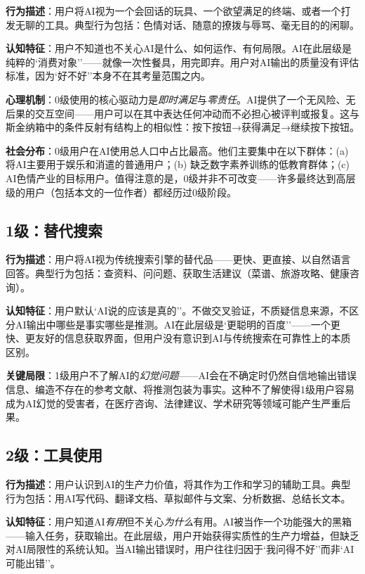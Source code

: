 \documentclass[12pt,a4paper]{ctexart}
\begin{document}
\textbf{行为描述}：用户将AI视为一个会回话的玩具、一个欲望满足的终端、或者一个打发无聊的工具。典型行为包括：色情对话、随意的撩拨与辱骂、毫无目的的闲聊。

\textbf{认知特征}：用户不知道也不关心AI是什么、如何运作、有何局限。AI在此层级是纯粹的`消费对象''——就像一次性餐具，用完即弃。用户对AI输出的质量没有评估标准，因为`好不好''本身不在其考量范围之内。

\textbf{心理机制}：0级使用的核心驱动力是\textit{即时满足}与\textit{零责任}。AI提供了一个无风险、无后果的交互空间——用户可以在其中表达任何冲动而不必担心被评判或报复。这与斯金纳箱中的条件反射有结构上的相似性：按下按钮→获得满足→继续按下按钮。

\textbf{社会分布}：0级用户在AI使用总人口中占比最高。他们主要集中在以下群体：(a) 将AI主要用于娱乐和消遣的普通用户；(b) 缺乏数字素养训练的低教育群体；(c) AI色情产业的目标用户。值得注意的是，0级并非不可改变——许多最终达到高层级的用户（包括本文的一位作者）都经历过0级阶段。

\subsection{1级：替代搜索}

\textbf{行为描述}：用户将AI视为传统搜索引擎的替代品——更快、更直接、以自然语言回答。典型行为包括：查资料、问问题、获取生活建议（菜谱、旅游攻略、健康咨询）。

\textbf{认知特征}：用户默认`AI说的应该是真的''。不做交叉验证，不质疑信息来源，不区分AI输出中哪些是事实哪些是推测。AI在此层级是`更聪明的百度''——一个更快、更友好的信息获取界面，但用户没有意识到AI与传统搜索在可靠性上的本质区别。

\textbf{关键局限}：1级用户不了解AI的\emph{幻觉问题}——AI会在不确定时仍然自信地输出错误信息、编造不存在的参考文献、将推测包装为事实。这种不了解使得1级用户容易成为AI幻觉的受害者，在医疗咨询、法律建议、学术研究等领域可能产生严重后果。

\subsection{2级：工具使用}

\textbf{行为描述}：用户认识到AI的生产力价值，将其作为工作和学习的辅助工具。典型行为包括：用AI写代码、翻译文档、草拟邮件与文案、分析数据、总结长文本。

\textbf{认知特征}：用户知道AI\emph{有用}但不关心\emph{为什么}有用。AI被当作一个功能强大的黑箱——输入任务，获取输出。在此层级，用户开始获得实质性的生产力增益，但缺乏对AI局限性的系统认知。当AI输出错误时，用户往往归因于`我问得不好''而非`AI可能出错''。
\end{document}
